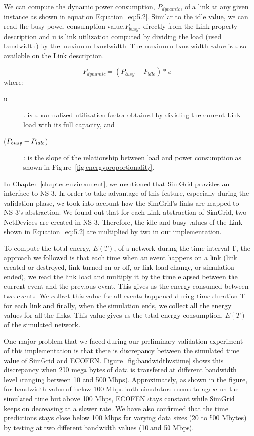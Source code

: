 We can compute the dynamic power consumption, \(P_{dynamic}\), of a link at any given instance as shown in equation Equation~\ref{eq:5.2}. Similar to the idle value, we can read the busy power consumption value,\(P_{busy}\), directly from the 
Link property description and u is link utilization computed by dividing the load (used bandwidth) by the maximum bandwidth. The maximum bandwidth value is also available on the Link description. 

\begin{equation} \label{eq:5.2}
P_{dynamic} = (P_{busy} - P_{idle}) * u 
\end{equation} 
where:
\begin{description}
    \item [u]: is a normalized utilization factor obtained by dividing the current Link load with its full capacity, and 
    \item [(\($$P_{busy} - P_{idle}$$\))]: is the slope of the relationship between load and power consumption as shown in Figure~\ref{fig:energyproportionality}.
\end{description} 
In Chapter~\ref{chapter:environment}, we mentioned that SimGrid provides an interface to NS-3. In order to take advantage of this feature, especially during the validation phase, we took into account how the SimGrid's links are mapped to NS-3's abstraction. We found out that for each Link abstraction of SimGrid, two NetDevices are created in NS-3. Therefore, the idle and busy values of the Link shown in Equation~\ref{eq:5.2} are multiplied by two in our implementation.

To compute the total energy, \(E(T)\), of a network during the time interval T, the approach we followed is that each time when an event happens on a link (link created or destroyed, link turned on or off, or link load change, or simulation ended), we read the link load and multiply it by the time elapsed between the current event and the previous event. This gives us the energy consumed between two events. We collect this value for all events happened during time duration T for each link and finally, when the simulation ends, we collect all the energy values for all the links. This value gives us the total energy consumption, \(E(T)\) of the simulated network.

One major problem that we faced during our preliminary validation experiment of this implementation is that there is discrepancy between the simulated time value of SimGrid and ECOFEN. Figure~\ref{fig:bandwidthvstime} shows this discrepancy when 200 mega bytes of data is transfered at different bandwidth level (ranging between 10 and 500 Mbps). Approximately, as shown in the figure, for bandwidth value of below 100 Mbps both simulators seems to agree on the simulated time but above 100 Mbps, ECOFEN stays constant while SimGrid keeps on decreasing at a slower rate. We have also confirmed that the time predictions stays close below 100 Mbps for varying data sizes (20 to 500 Mbytes) by testing at two different bandwidth values (10 and 50 Mbps).

